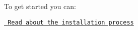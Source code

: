 To get started you can\+:


\begin{DoxyItemize}
\item \href{./md_pages_getstarted_build_and_install.html}{\texttt{ Read about the installation process}} 
\end{DoxyItemize}
